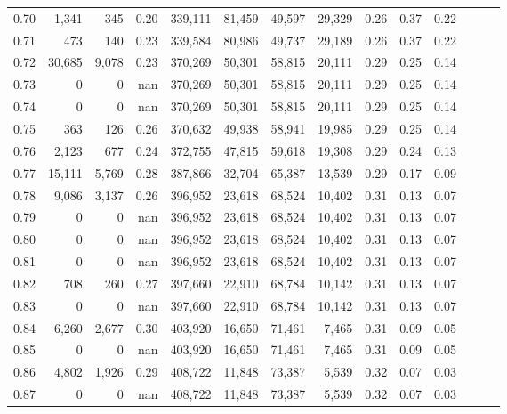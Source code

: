 \begin{tabular}{rrrrrrrrrrrrrr}
0.70 &   1,341 &    345 &  0.20 &  339,111 &   81,459 &  49,597 &  29,329 &  0.26 &  0.37 &      0.22 \\
0.71 &     473 &    140 &  0.23 &  339,584 &   80,986 &  49,737 &  29,189 &  0.26 &  0.37 &      0.22 \\
0.72 &  30,685 &  9,078 &  0.23 &  370,269 &   50,301 &  58,815 &  20,111 &  0.29 &  0.25 &      0.14 \\
0.73 &       0 &      0 &   nan &  370,269 &   50,301 &  58,815 &  20,111 &  0.29 &  0.25 &      0.14 \\
0.74 &       0 &      0 &   nan &  370,269 &   50,301 &  58,815 &  20,111 &  0.29 &  0.25 &      0.14 \\
0.75 &     363 &    126 &  0.26 &  370,632 &   49,938 &  58,941 &  19,985 &  0.29 &  0.25 &      0.14 \\
0.76 &   2,123 &    677 &  0.24 &  372,755 &   47,815 &  59,618 &  19,308 &  0.29 &  0.24 &      0.13 \\
0.77 &  15,111 &  5,769 &  0.28 &  387,866 &   32,704 &  65,387 &  13,539 &  0.29 &  0.17 &      0.09 \\
0.78 &   9,086 &  3,137 &  0.26 &  396,952 &   23,618 &  68,524 &  10,402 &  0.31 &  0.13 &      0.07 \\
0.79 &       0 &      0 &   nan &  396,952 &   23,618 &  68,524 &  10,402 &  0.31 &  0.13 &      0.07 \\
0.80 &       0 &      0 &   nan &  396,952 &   23,618 &  68,524 &  10,402 &  0.31 &  0.13 &      0.07 \\
0.81 &       0 &      0 &   nan &  396,952 &   23,618 &  68,524 &  10,402 &  0.31 &  0.13 &      0.07 \\
0.82 &     708 &    260 &  0.27 &  397,660 &   22,910 &  68,784 &  10,142 &  0.31 &  0.13 &      0.07 \\
0.83 &       0 &      0 &   nan &  397,660 &   22,910 &  68,784 &  10,142 &  0.31 &  0.13 &      0.07 \\
0.84 &   6,260 &  2,677 &  0.30 &  403,920 &   16,650 &  71,461 &   7,465 &  0.31 &  0.09 &      0.05 \\
0.85 &       0 &      0 &   nan &  403,920 &   16,650 &  71,461 &   7,465 &  0.31 &  0.09 &      0.05 \\
0.86 &   4,802 &  1,926 &  0.29 &  408,722 &   11,848 &  73,387 &   5,539 &  0.32 &  0.07 &      0.03 \\
0.87 &       0 &      0 &   nan &  408,722 &   11,848 &  73,387 &   5,539 &  0.32 &  0.07 &      0.03 \\

\end{tabular}

